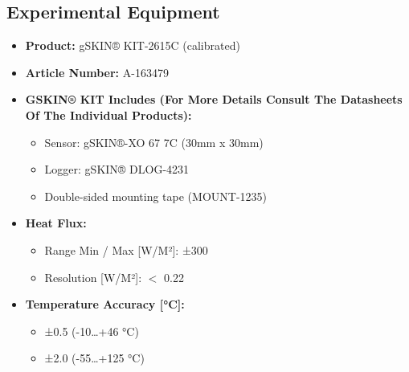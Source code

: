 

\begin{theappendices}


\chapter{Experimental Equipment}



\begin{table}[tbh]
\begin{framed}  
\small
{}
\begin{itemize}[topsep=1pt,itemsep=1pt,partopsep=1pt, parsep=1pt]
    \item \textbf{Product:} gSKIN® KIT-2615C (calibrated)
    \item \textbf{Article Number:} A-163479
    \item \textbf{GSKIN® KIT Includes (For More Details Consult The Datasheets Of The Individual Products):}
    \begin{itemize}[topsep=0pt,itemsep=0pt,partopsep=0pt, parsep=0pt]
        \item Sensor: gSKIN®-XO 67 7C (30mm x 30mm)
        \item Logger: gSKIN® DLOG-4231
        \item Double-sided mounting tape (MOUNT-1235)
    \end{itemize}
    \item \textbf{Heat Flux:}
    \begin{itemize}[topsep=0pt,itemsep=0pt,partopsep=0pt, parsep=0pt]
        \item Range Min / Max [W/M²]: ±300
        \item Resolution [W/M²]: $<$ 0.22
    \end{itemize}
    \item \textbf{Temperature Accuracy [°C]:}
    \begin{itemize}[topsep=0pt,itemsep=0pt,partopsep=0pt, parsep=0pt]
        \item ±0.5 (-10…+46 °C)
        \item ±2.0 (-55…+125 °C)
    \end{itemize}
    

\end{itemize}
\end{framed}
\end{table}
\end{theappendices}

